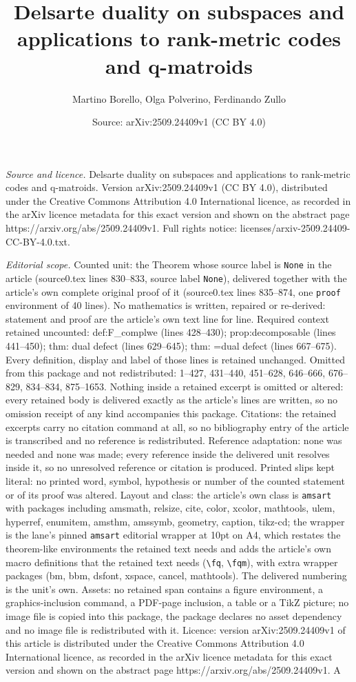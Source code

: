 \documentclass[10pt,a4paper]{amsart}
\title[Delsarte duality on subspaces and applications to rank-metri]{Delsarte duality on subspaces and applications to rank-metric codes and q-matroids}
\author{Martino Borello, Olga Polverino, Ferdinando Zullo}
\date{Source: arXiv:2509.24409v1 (CC BY 4.0)}
\begin{document}
\maketitle

\noindent\emph{Source and licence.} Delsarte duality on subspaces and applications to rank-metric codes and q-matroids. Version arXiv:2509.24409v1 (CC BY 4.0), distributed under the Creative Commons Attribution 4.0 International licence, as recorded in the arXiv licence metadata for this exact version and shown on the abstract page https://arxiv.org/abs/2509.24409v1. Full rights notice: licenses/arxiv-2509.24409-CC-BY-4.0.txt.\par\smallskip

\noindent\textit{Editorial scope.} Counted unit: the Theorem whose source label is \texttt{None} in the article (source0.tex lines 830--833, source label \texttt{None}), delivered together with the article's own complete original proof of it (source0.tex lines 835--874, one \texttt{proof} environment of 40 lines). No mathematics is written, repaired or re-derived: statement and proof are the article's own text line for line. Required context retained uncounted: def:F\_complwe (lines 428--430); prop:decomposable (lines 441--450); thm: dual defect (lines 629--645); thm: =dual defect (lines 667--675). Every definition, display and label of those lines is retained unchanged. Omitted from this package and not redistributed: 1--427, 431--440, 451--628, 646--666, 676--829, 834--834, 875--1653. Nothing inside a retained excerpt is omitted or altered: every retained body is delivered exactly as the article's lines are written, so no omission receipt of any kind accompanies this package. Citations: the retained excerpts carry no citation command at all, so no bibliography entry of the article is transcribed and no reference is redistributed. Reference adaptation: none was needed and none was made; every reference inside the delivered unit resolves inside it, so no unresolved reference or citation is produced. Printed slips kept literal: no printed word, symbol, hypothesis or number of the counted statement or of its proof was altered. Layout and class: the article's own class is \texttt{amsart} with packages including amsmath, relsize, cite, color, xcolor, mathtools, ulem, hyperref, enumitem, amsthm, amssymb, geometry, caption, tikz-cd; the wrapper is the lane's pinned \texttt{amsart} editorial wrapper at 10pt on A4, which restates the theorem-like environments the retained text needs and adds the article's own macro definitions that the retained text needs (\texttt{\textbackslash fq}, \texttt{\textbackslash fqm}), with extra wrapper packages (bm, bbm, dsfont, xspace, cancel, mathtools). The delivered numbering is the unit's own. Assets: no retained span contains a figure environment, a graphics-inclusion command, a PDF-page inclusion, a table or a TikZ picture; no image file is copied into this package, the package declares no asset dependency and no image file is redistributed with it. Licence: version arXiv:2509.24409v1 of this article is distributed under the Creative Commons Attribution 4.0 International licence, as recorded in the arXiv licence metadata for this exact version and shown on the abstract page https://arxiv.org/abs/2509.24409v1. A 
\end{document}
